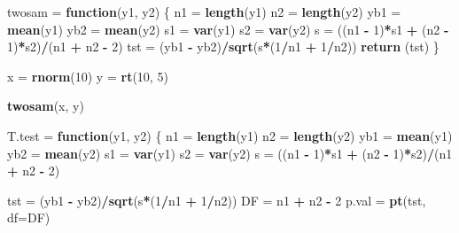 \documentclass[11pt,]{krantz}
\makeatletter
\newenvironment{Shaded}{\begin{snugshade}}{\end{snugshade}}
\newcommand{\KeywordTok}[1]{\textcolor[rgb]{0.13,0.29,0.53}{\textbf{#1}}}
\newcommand{\DataTypeTok}[1]{\textcolor[rgb]{0.13,0.29,0.53}{#1}}
\newcommand{\DecValTok}[1]{\textcolor[rgb]{0.00,0.00,0.81}{#1}}
\newcommand{\StringTok}[1]{\textcolor[rgb]{0.31,0.60,0.02}{#1}}
\newcommand{\ControlFlowTok}[1]{\textcolor[rgb]{0.13,0.29,0.53}{\textbf{#1}}}
\newcommand{\OperatorTok}[1]{\textcolor[rgb]{0.81,0.36,0.00}{\textbf{#1}}}
\newcommand{\NormalTok}[1]{#1}
\newenvironment{kframe}{%
\medskip{}
\setlength{\fboxsep}{.8em}
 \def\at@end@of@kframe{}%
 \ifinner\ifhmode%
  \def\at@end@of@kframe{\end{minipage}}%
  \begin{minipage}{\columnwidth}%
 \fi\fi%
 \def\FrameCommand##1{\hskip\@totalleftmargin \hskip-\fboxsep
 \colorbox{shadecolor}{##1}\hskip-\fboxsep
     \hskip-\linewidth \hskip-\@totalleftmargin \hskip\columnwidth}%
 \MakeFramed {\advance\hsize-\width
   \@totalleftmargin\z@ \linewidth\hsize
   \@setminipage}}%
 {\par\unskip\endMakeFramed%
 \at@end@of@kframe}
\renewenvironment{Shaded}{\begin{kframe}}{\end{kframe}}
\theoremstyle{definition}
\theoremstyle{definition}
\theoremstyle{remark}
\makeatother
\begin{document}
\begin{Shaded}
\begin{Highlighting}[]
\NormalTok{twosam =}\StringTok{ }\ControlFlowTok{function}\NormalTok{(y1, y2) }
\NormalTok{\{}
\NormalTok{  n1  =}\StringTok{ }\KeywordTok{length}\NormalTok{(y1)}
\NormalTok{  n2  =}\StringTok{ }\KeywordTok{length}\NormalTok{(y2)}
\NormalTok{  yb1 =}\StringTok{ }\KeywordTok{mean}\NormalTok{(y1)}
\NormalTok{  yb2 =}\StringTok{ }\KeywordTok{mean}\NormalTok{(y2)}
\NormalTok{  s1  =}\StringTok{ }\KeywordTok{var}\NormalTok{(y1)}
\NormalTok{  s2  =}\StringTok{ }\KeywordTok{var}\NormalTok{(y2) }
\NormalTok{  s   =}\StringTok{ }\NormalTok{((n1 }\OperatorTok{-}\StringTok{ }\DecValTok{1}\NormalTok{)}\OperatorTok{*}\NormalTok{s1 }\OperatorTok{+}\StringTok{ }\NormalTok{(n2 }\OperatorTok{-}\StringTok{ }\DecValTok{1}\NormalTok{)}\OperatorTok{*}\NormalTok{s2)}\OperatorTok{/}\NormalTok{(n1 }\OperatorTok{+}\StringTok{ }\NormalTok{n2 }\OperatorTok{-}\StringTok{ }\DecValTok{2}\NormalTok{)}
\NormalTok{  tst =}\StringTok{ }\NormalTok{(yb1 }\OperatorTok{-}\StringTok{ }\NormalTok{yb2)}\OperatorTok{/}\KeywordTok{sqrt}\NormalTok{(s}\OperatorTok{*}\NormalTok{(}\DecValTok{1}\OperatorTok{/}\NormalTok{n1 }\OperatorTok{+}\StringTok{ }\DecValTok{1}\OperatorTok{/}\NormalTok{n2))}
  \KeywordTok{return}\NormalTok{ (tst)}
\NormalTok{\}}

\NormalTok{x =}\StringTok{ }\KeywordTok{rnorm}\NormalTok{(}\DecValTok{10}\NormalTok{)}
\NormalTok{y =}\StringTok{ }\KeywordTok{rt}\NormalTok{(}\DecValTok{10}\NormalTok{, }\DecValTok{5}\NormalTok{)}

\KeywordTok{twosam}\NormalTok{(x, y)}

\NormalTok{T.test =}\StringTok{ }\ControlFlowTok{function}\NormalTok{(y1, y2) }
\NormalTok{\{}
\NormalTok{  n1  =}\StringTok{ }\KeywordTok{length}\NormalTok{(y1)}
\NormalTok{  n2  =}\StringTok{ }\KeywordTok{length}\NormalTok{(y2)}
\NormalTok{  yb1 =}\StringTok{ }\KeywordTok{mean}\NormalTok{(y1)}
\NormalTok{  yb2 =}\StringTok{ }\KeywordTok{mean}\NormalTok{(y2)}
\NormalTok{  s1  =}\StringTok{ }\KeywordTok{var}\NormalTok{(y1)}
\NormalTok{  s2  =}\StringTok{ }\KeywordTok{var}\NormalTok{(y2) }
\NormalTok{  s   =}\StringTok{ }\NormalTok{((n1 }\OperatorTok{-}\StringTok{ }\DecValTok{1}\NormalTok{)}\OperatorTok{*}\NormalTok{s1 }\OperatorTok{+}\StringTok{ }\NormalTok{(n2 }\OperatorTok{-}\StringTok{ }\DecValTok{1}\NormalTok{)}\OperatorTok{*}\NormalTok{s2)}\OperatorTok{/}\NormalTok{(n1 }\OperatorTok{+}\StringTok{ }\NormalTok{n2 }\OperatorTok{-}\StringTok{ }\DecValTok{2}\NormalTok{)}

\NormalTok{  tst =}\StringTok{ }\NormalTok{(yb1 }\OperatorTok{-}\StringTok{ }\NormalTok{yb2)}\OperatorTok{/}\KeywordTok{sqrt}\NormalTok{(s}\OperatorTok{*}\NormalTok{(}\DecValTok{1}\OperatorTok{/}\NormalTok{n1 }\OperatorTok{+}\StringTok{ }\DecValTok{1}\OperatorTok{/}\NormalTok{n2))}
\NormalTok{  DF =}\StringTok{ }\NormalTok{n1 }\OperatorTok{+}\StringTok{ }\NormalTok{n2 }\OperatorTok{-}\StringTok{ }\DecValTok{2}
\NormalTok{  p.val =}\StringTok{ }\KeywordTok{pt}\NormalTok{(tst, }\DataTypeTok{df=}\NormalTok{DF)}
  

\end{Highlighting}
\end{Shaded}
\end{document}
